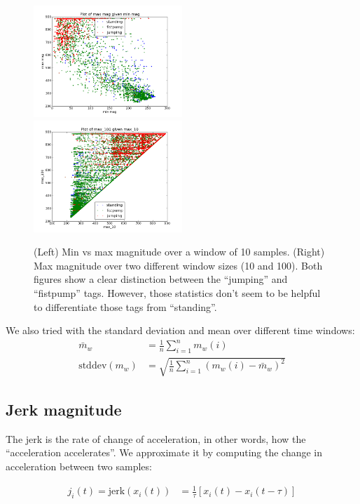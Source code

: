 \documentclass{article}
\begin{document}
\begin{figure}
\includegraphics[width=0.5\textwidth]{images/plot--min_mag-max_mag--all--standing_fistpump_jumping_no-other.png}
\includegraphics[width=0.5\textwidth]{images/plot--max_10-max_100--all--standing_jumping_fistpump_no-other.png}
\caption{(Left) Min vs max magnitude over a window of 10 samples. (Right) Max magnitude over two different window sizes (10 and 100). Both figures show a clear distinction between the ``jumping'' and ``fistpump'' tags. However, those statistics don't seem to be helpful to differentiate those tags from ``standing''.}
\label{minmaxf0}
\end{figure}

We also tried with the standard deviation and mean over different time windows:
\begin{align}
\bar{m}_w &= \frac{1}{n}\sum_{i=1}^n m_w(i)\\
\textrm{stddev}(m_w) &= \sqrt{\frac{1}{n}\sum_{i=1}^n (m_w(i) - \bar{m}_w)^2}
\end{align}

\subsection{Jerk magnitude}

The jerk is the rate of change of acceleration, in other words, how the ``acceleration accelerates''. We approximate it by computing the change in acceleration between two samples:

\begin{align}
j_i(t) = \textrm{jerk}(x_i(t)) &= \frac{1}{\tau} [ x_i(t) - x_i(t-\tau) ]
\end{align}
\end{document}
